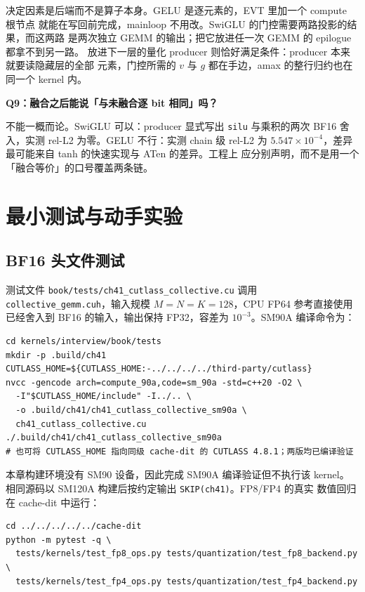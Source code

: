 决定因素是后端而不是算子本身。GELU 是逐元素的，EVT 里加一个 compute 根节点
就能在写回前完成，mainloop 不用改。SwiGLU 的门控需要两路投影的结果，而这两路
是两次独立 GEMM 的输出；把它放进任一次 GEMM 的 epilogue 都拿不到另一路。
放进下一层的量化 producer 则恰好满足条件：producer 本来就要读隐藏层的全部
元素，门控所需的 $v$ 与 $g$ 都在手边，amax 的整行归约也在同一个 kernel 内。

\textbf{Q9：融合之后能说「与未融合逐 bit 相同」吗？}

不能一概而论。SwiGLU 可以：producer 显式写出 \texttt{silu} 与乘积的两次
BF16 舍入，实测 rel-L2 为零。GELU 不行：实测 chain 级 rel-L2 为
$5.547\times10^{-4}$，差异最可能来自 tanh 的快速实现与 ATen 的差异。工程上
应分别声明，而不是用一个「融合等价」的口号覆盖两条链。

\section{最小测试与动手实验}

\subsection{BF16 头文件测试}

测试文件 \texttt{book/tests/ch41\_cutlass\_collective.cu} 调用
\texttt{collective\_}\allowbreak\texttt{gemm.cuh}，输入规模 $M=N=K=128$，CPU FP64 参考直接使用
已经舍入到 BF16 的输入，输出保持 FP32，容差为 $10^{-3}$。SM90A 编译命令为：

\begin{lstlisting}[style=console]
cd kernels/interview/book/tests
mkdir -p .build/ch41
CUTLASS_HOME=${CUTLASS_HOME:-../../../../third-party/cutlass}
nvcc -gencode arch=compute_90a,code=sm_90a -std=c++20 -O2 \
  -I"$CUTLASS_HOME/include" -I../.. \
  -o .build/ch41/ch41_cutlass_collective_sm90a \
  ch41_cutlass_collective.cu
./.build/ch41/ch41_cutlass_collective_sm90a
# 也可将 CUTLASS_HOME 指向同级 cache-dit 的 CUTLASS 4.8.1；两版均已编译验证
\end{lstlisting}

本章构建环境没有 SM90 设备，因此完成 SM90A 编译验证但不执行该 kernel。
相同源码以 SM120A 构建后按约定输出 \texttt{SKIP(ch41)}。FP8/FP4 的真实
数值回归在 cache-dit 中运行：

\begin{lstlisting}[style=console]
cd ../../../../../cache-dit
python -m pytest -q \
  tests/kernels/test_fp8_ops.py tests/quantization/test_fp8_backend.py \
  tests/kernels/test_fp4_ops.py tests/quantization/test_fp4_backend.py
\end{lstlisting}

